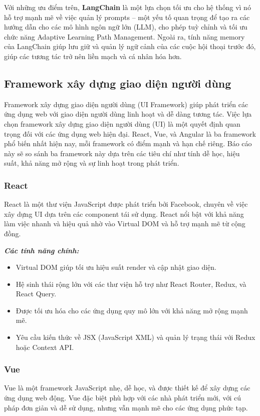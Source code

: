 Với những ưu điểm trên, \textbf{LangChain} là một lựa chọn tối ưu cho hệ thống vì nó hỗ trợ mạnh mẽ về việc quản lý prompts – một yếu tố quan trọng để tạo ra các hướng dẫn cho các mô hình ngôn ngữ lớn (LLM), cho phép tuỳ chỉnh và tối ưu chức năng Adaptive Learning Path Management. Ngoài ra, tính năng memory của LangChain giúp lưu giữ và quản lý ngữ cảnh của các cuộc hội thoại trước đó, giúp các tương tác trở nên liền mạch và cá nhân hóa hơn.

\subsection{Framework xây dựng giao diện người dùng}

Framework xây dựng giao diện người dùng (UI Framework) giúp phát triển các ứng dụng web với giao diện người dùng linh hoạt và dễ dàng tương tác. Việc lựa chọn framework xây dựng giao diện người dùng (UI) là một quyết định quan trọng đối với các ứng dụng web hiện đại. React, Vue, và Angular là ba framework phổ biến nhất hiện nay, mỗi framework có điểm mạnh và hạn chế riêng. Báo cáo này sẽ so sánh ba framework này dựa trên các tiêu chí như tính dễ học, hiệu suất, khả năng mở rộng và sự linh hoạt trong phát triển.

\subsubsection{React}
React là một thư viện JavaScript được phát triển bởi Facebook, chuyên về việc xây dựng UI dựa trên các component tái sử dụng. React nổi bật với khả năng làm việc nhanh và hiệu quả nhờ vào Virtual DOM và hỗ trợ mạnh mẽ từ cộng đồng.

\par \textbf{\textit{Các tính năng chính:}} \begin{itemize} \item Virtual DOM giúp tối ưu hiệu suất render và cập nhật giao diện. \item Hệ sinh thái rộng lớn với các thư viện hỗ trợ như React Router, Redux, và React Query. \item Được tối ưu hóa cho các ứng dụng quy mô lớn với khả năng mở rộng mạnh mẽ. \item Yêu cầu kiến thức về JSX (JavaScript XML) và quản lý trạng thái với Redux hoặc Context API. \end{itemize}

\subsubsection{Vue}
Vue là một framework JavaScript nhẹ, dễ học, và được thiết kế để xây dựng các ứng dụng web động. Vue đặc biệt phù hợp với các nhà phát triển mới, với cú pháp đơn giản và dễ sử dụng, nhưng vẫn mạnh mẽ cho các ứng dụng phức tạp.

